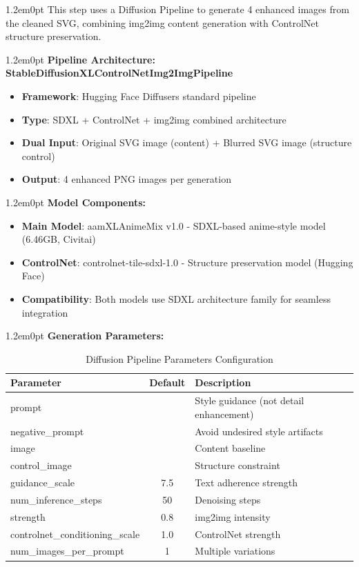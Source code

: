 \documentclass[10pt,a4paper]{article}
\newenvironment{bodytext}{\begin{adjustwidth}{1.2em}{0pt}}{\end{adjustwidth}}
\begin{document}
\begin{bodytext}
This step uses a Diffusion Pipeline to generate 4 enhanced images from the cleaned SVG, combining img2img content generation with ControlNet structure preservation.
\end{bodytext}

\begin{bodytext}
\textbf{Pipeline Architecture: StableDiffusionXLControlNetImg2ImgPipeline}
\begin{itemize}
\item \textbf{Framework}: Hugging Face Diffusers standard pipeline
\item \textbf{Type}: SDXL + ControlNet + img2img combined architecture
\item \textbf{Dual Input}: Original SVG image (content) + Blurred SVG image (structure control)
\item \textbf{Output}: 4 enhanced PNG images per generation
\end{itemize}
\end{bodytext}

\begin{bodytext}
\textbf{Model Components:}
\begin{itemize}
\item \textbf{Main Model}: aamXLAnimeMix v1.0 - SDXL-based anime-style model (6.46GB, Civitai)
\item \textbf{ControlNet}: controlnet-tile-sdxl-1.0 - Structure preservation model (Hugging Face)
\item \textbf{Compatibility}: Both models use SDXL architecture family for seamless integration
\end{itemize}
\end{bodytext}

\begin{bodytext}
\textbf{Generation Parameters:}
\end{bodytext}

\begin{table}[h!]
\centering
\small
\begin{tabular}{|l|c|l|}
\hline
\textbf{Parameter} & \textbf{Default} & \textbf{Description} \\
\hline
prompt & & Style guidance (not detail enhancement) \\
\hline
negative\_prompt & & Avoid undesired style artifacts \\
\hline
image & & Content baseline \\
\hline
control\_image & & Structure constraint \\
\hline
guidance\_scale & 7.5 & Text adherence strength \\
\hline
num\_inference\_steps & 50 & Denoising steps \\
\hline
strength & 0.8 & img2img intensity \\
\hline
controlnet\_conditioning\_scale & 1.0 & ControlNet strength \\
\hline
num\_images\_per\_prompt & 1 & Multiple variations \\
\hline
\end{tabular}
\caption{Diffusion Pipeline Parameters Configuration}
\end{table}
\end{document}
